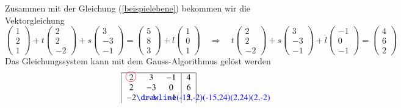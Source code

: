 \begin{beispiel}
{\parindent0pt Zusammen} mit der Gleichung (\ref{beispielebene}) bekommen wir die
Vektorgleichung
\[
\begin{pmatrix}1\\2\\1 \end{pmatrix}
+
t\begin{pmatrix}2\\2\\-2\end{pmatrix}
+
s\begin{pmatrix}3\\-3\\-1\end{pmatrix}
=
\begin{pmatrix} 5\\8\\3 \end{pmatrix}
+
l\begin{pmatrix} 1\\0\\1 \end{pmatrix}
\quad\Rightarrow\quad
t\begin{pmatrix}2\\2\\-2\end{pmatrix}
+
s\begin{pmatrix}3\\-3\\-1\end{pmatrix}
+
l\begin{pmatrix} -1\\0\\-1 \end{pmatrix}
=
\begin{pmatrix} 4\\6\\2 \end{pmatrix}
\]
Das Gleichungssystem kann mit dem Gauss-Algorithmus
gelöst werden
\begin{align*}
\begin{tabular}{|>{$}c<{$}>{$}c<{$}>{$}c<{$}|>{$}c<{$}|}
\hline
 2%
\begin{picture}(0,0)
\color{red}\put(-3,4){\circle{12}}
\end{picture}%
& 3&-1&4\\
 2&-3& 0&6\\
-2%
\begin{picture}(0,0)
\color{blue}\drawline(-15,-2)(-15,24)(2,24)(2,-2)
\end{picture}
&-1&-1&2\\

\end{tabular}
\end{align*}
\end{beispiel}
